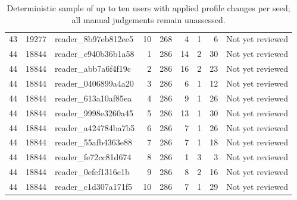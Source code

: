 \begin{table}[htbp!]
\begin{tabular}{rrlrrrrrl}
43 & 19277 & reader\_8b97eb812ee5 & 10 & 268 & 4 & 1 & 6 & Not yet reviewed \\
44 & 18844 & reader\_c940b36b1a58 & 1 & 286 & 14 & 2 & 30 & Not yet reviewed \\
44 & 18844 & reader\_abb7a6f4f19c & 2 & 286 & 16 & 2 & 23 & Not yet reviewed \\
44 & 18844 & reader\_0406899a4a20 & 3 & 286 & 6 & 1 & 12 & Not yet reviewed \\
44 & 18844 & reader\_613a10af85ea & 4 & 286 & 9 & 1 & 26 & Not yet reviewed \\
44 & 18844 & reader\_9998e3260a45 & 5 & 286 & 13 & 1 & 30 & Not yet reviewed \\
44 & 18844 & reader\_a424784ba7b5 & 6 & 286 & 7 & 1 & 26 & Not yet reviewed \\
44 & 18844 & reader\_55afb4363e88 & 7 & 286 & 7 & 1 & 18 & Not yet reviewed \\
44 & 18844 & reader\_fe72cc81d674 & 8 & 286 & 1 & 3 & 3 & Not yet reviewed \\
44 & 18844 & reader\_0efef1316e1b & 9 & 286 & 8 & 2 & 16 & Not yet reviewed \\
44 & 18844 & reader\_c1d307a171f5 & 10 & 286 & 7 & 1 & 29 & Not yet reviewed \\
\hline
\end{tabular}
\caption{Deterministic sample of up to ten users with applied profile changes per seed; all manual judgements remain unassessed.}
\label{chap:results:tab:rq3_profile_review_selection}
\end{table}

